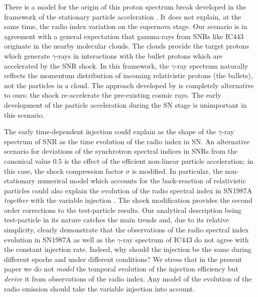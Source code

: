 \documentclass{aa}
\newcommand\g{$\gamma$}
\begin{document}
There is a model for the origin of this proton spectrum break developed in the framework of the stationary particle acceleration \citep{Uchiyama-etal-2010,Cardillo-etal-2016}.  It does not explain, at the same time, the radio index variation on the supernova stage. Our scenario is in agreement with a general expectation that gamma-rays from SNRs like IC443 originate in the nearby molecular clouds. The clouds provide the target protons which generate \g-rays in interactions with the bullet protons which are accelerated by the SNR shock. In this framework, the \g-ray spectrum naturally reflects the momentum distribution of incoming relativistic protons (the ballets), not the particles in a cloud. The approach developed by \citet{Uchiyama-etal-2010,Cardillo-etal-2016} is completely alternative to ours: the shock re-accelerate the pre-existing cosmic rays. The early development of the particle acceleration during the SN stage is unimportant in this scenario.

The early time-dependent injection could explain as the shape of the \g-ray spectrum of SNR as the time evolution of the radio index in SN.
An alternative scenario for deviations of the synchrotron spectral indices in SNRs from the canonical value $0.5$ is the effect of the efficient non-linear particle acceleration; in this case, the shock compression factor $\sigma$ is modified. In particular, the non-stationary numerical model which accounts for the back-reaction of relativistic particles could also explain the evolution of the radio spectral index in SN1987A \citep[though with a lower accuracy, cf. Fig. 3 in ][ and our Fig.~\ref{alpha:figalpha}]{ber-ks-volk-2015} {\it together} with the variable injection \citep[dashed line on Fig.~3 in ][]{ber-ks-volk-2015}. The shock modification provides the second order corrections to the test-particle results. Our analytical description being test-particle in its nature catches the main trends and, due to its relative simplicity, clearly demonstrate that the observations of the radio spectral index evolution in SN1987A as well as the \g-ray spectrum of IC443 do not agree with the constant injection rate. Indeed, why should the injection be the same during different epochs and under different conditions? 
We stress that in the present paper we do not {\it model} the temporal evolution of the injection efficiency but {\it derive} it from observations of the radio index. Any model of the evolution of the radio emission should take the variable injection into account.
\end{document}
